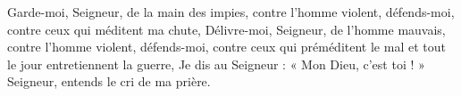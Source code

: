 Garde-moi, Seigneur, de la main des impies, contre l'homme violent, défends-moi, contre ceux qui méditent ma chute,
\versseparator
Délivre-moi, Seigneur, de l'homme mauvais, contre l'homme violent, défends-moi,
\versseparator
contre ceux qui préméditent le mal et tout le jour entretiennent la guerre,
\versseparator
Je dis au Seigneur : « Mon Dieu, c'est toi ! » Seigneur, entends le cri de ma prière.
